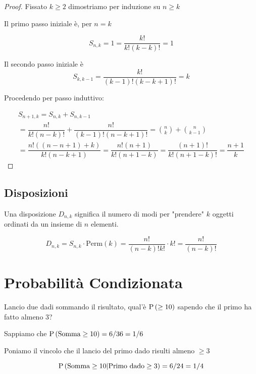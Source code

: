 \begin{proof}
	Fissato $ k \geq 2 $ dimostriamo per induzione su $ n \geq k $
	
	Il primo passo iniziale è, per $ n = k $

	\begin{equation*}
		S_{n,k} = 1 = \dfrac{k!}{k!(k-k)!} = 1
	\end{equation*}	
	
	Il secondo passo iniziale è
	\begin{equation*}
		S_{k,k-1} = \dfrac{k!}{(k-1)!(k-k+1)!} = k
	\end{equation*}
	
	Procedendo per passo induttivo:
	
	\begin{equation*}
		\begin{aligned}
			S_{n+1,k} = S_{n,k} + S_{n,k-1} \\
			= \dfrac{n!}{k!(n-k)!} + \dfrac{n!}{(k-1)!(n-k+1)!} = \binom{n}{k} + \binom{n}{k-1} \\
			= \dfrac{n!((n-n+1) + k)}{k!(n-k+1)} = \dfrac{n!(n+1)}{k!(n+1-k)} = \dfrac{(n+1)!}{k!(n+1-k)!} = \dfrac{n+1}{k}	
		\end{aligned}
	\end{equation*}
\end{proof}

\subsection{Disposizioni}

\begin{defn}
	Una disposizione $ D_{n,k} $ significa il numero di modi per "prendere" $ k $ oggetti ordinati da un insieme di $ n $ elementi.
	
	\begin{equation}
	D_{n,k} = S_{n,k} \cdot \text{Perm}(k) = \dfrac{n!}{(n-k)!k!} \cdot k! = \dfrac{n!}{(n-k)!}
	\end{equation}
\end{defn}

\section{Probabilità Condizionata}

\begin{exmp}
	Lancio due dadi sommando il risultato, qual'è $ \text{P}\left(\geq 10\right) $ sapendo che il primo ha fatto almeno 3?
	
	Sappiamo che $ \text{P}\left(\text{Somma} \geq 10\right) = 6/36 = 1/6 $
	
	Poniamo il vincolo che il lancio del primo dado risulti almeno $ \geq 3 $
	
	\begin{equation*}
	\text{P}\left(\text{Somma} \geq 10 | \text{Primo dado} \geq 3\right) = 6/24 = 1/4
	\end{equation*}
\end{exmp}



